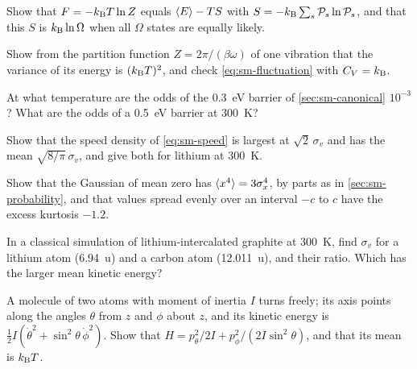 \begin{exercise}
\label{ex:sm-free}
Show that $F = -k_{\mathrm{B}} T\ln Z$ equals $\langle E \rangle - TS$ with $S =
-k_{\mathrm{B}}\sum_s\mathcal{P}_s\ln\mathcal{P}_s$, and that this $S$ is $k_{\mathrm{B}}\ln
\Omega$ when all $\Omega$ states are equally likely.
\end{exercise}

\begin{exercise}
\label{ex:sm-spring}
Show from the partition function $Z = 2\pi/(\beta\omega)$ of one
vibration that the variance of its energy is $(k_{\mathrm{B}} T)^2$, and check
\cref{eq:sm-fluctuation} with $C_V = k_{\mathrm{B}}$.
\end{exercise}

\begin{exercise}
\label{ex:sm-odds}
At what temperature are the odds of the \SI{0.3}{\electronvolt} barrier of
\cref{sec:sm-canonical} $10^{-3}$? What are the odds of a
\SI{0.5}{\electronvolt} barrier at \SI{300}{\kelvin}?
\end{exercise}

\begin{exercise}[speeds]
\label{ex:sm-speeds}
Show that the speed density of \cref{eq:sm-speed} is largest at
$\sqrt2\,\sigma_v$ and has the mean $\sqrt{8/\pi}\,\sigma_v$, and give
both for lithium at \SI{300}{\kelvin}.
\end{exercise}

\begin{exercise}
\label{ex:sm-fourth}
Show that the Gaussian of mean zero has $\langle x^4 \rangle = 3\sigma_x^4$, by
parts as in \cref{sec:sm-probability}, and that values spread evenly over
an interval $-c$ to $c$ have the excess kurtosis $-1.2$.
\end{exercise}

\begin{exercise}
\label{ex:sm-species}
In a classical simulation of lithium-intercalated graphite at
\SI{300}{\kelvin}, find $\sigma_v$
for a lithium atom (\SI{6.94}{\amu}) and a carbon atom
(\SI{12.011}{\amu}), and their ratio. Which has the larger mean kinetic
energy?
\end{exercise}

\begin{exercise}
\label{ex:sm-rotor}
A molecule of two atoms with moment of inertia $I$ turns freely; its axis
points along the angles $\theta$ from $z$ and $\phi$ about $z$, and its
kinetic energy is $\frac12I(\dot\theta^2 + \sin^2\theta\,\dot\phi^2)$.
Show that $H = p_\theta^2/2I + p_\phi^2/(2I\sin^2\theta)$, and that its
mean is $k_{\mathrm{B}} T$.
\end{exercise}

